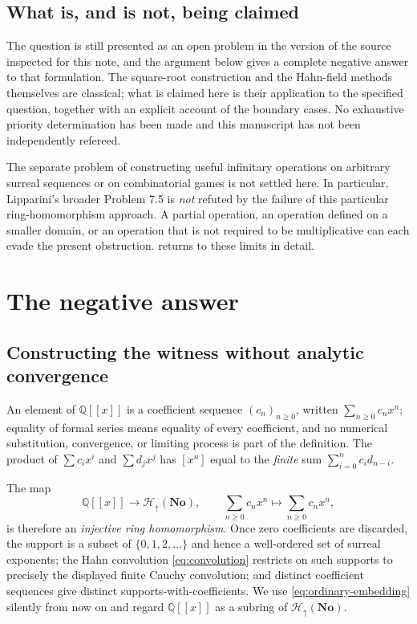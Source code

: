 \documentclass[11pt,letterpaper]{article}
\theoremstyle{definition}
\theoremstyle{remark}
\newcommand{\No}{\mathbf{No}}
\newcommand{\Q}{\mathbb Q}
\newcommand{\Hfull}{\mathcal H_{\uparrow}(\No)}
\newcommand{\coeff}[2]{[#1^{#2}]}
\begin{document}
\subsection{What is, and is not, being claimed}\label{sec:claims}
The question is still presented as an open problem in the version of the
source inspected for this note, and the argument below gives a complete
negative answer to that formulation. The square-root construction and the
Hahn-field methods themselves are classical; what is claimed here is their
application to the specified question, together with an explicit account of
the boundary cases. No exhaustive priority determination has been made and
this manuscript has not been independently refereed.

The separate problem of constructing useful infinitary operations on
arbitrary surreal sequences or on combinatorial games is not settled here.
In particular, Lipparini's broader Problem 7.5 is \emph{not} refuted by the
failure of this particular ring-homomorphism approach. A partial operation,
an operation defined on a smaller domain, or an operation that is not
required to be multiplicative can each evade the present obstruction.
 returns to these limits in detail.

\section{The negative answer}\label{sec:main}

\subsection{Constructing the witness without analytic convergence}
An element of $\Q[[x]]$ is a coefficient sequence $(c_n)_{n\ge0}$, written
$\sum_{n\ge0}c_nx^n$; equality of formal series means equality of every
coefficient, and no numerical substitution, convergence, or limiting process
is part of the definition. The product of $\sum c_ix^i$ and $\sum d_jx^j$ has
$\coeff{x}{n}$ equal to the \emph{finite} sum $\sum_{i=0}^{n}c_id_{n-i}$.

The map
\begin{equation}\label{eq:ordinary-embedding}
 \Q[[x]]\longrightarrow\Hfull,
 \qquad \sum_{n\ge0}c_nx^n\longmapsto\sum_{n\ge0}c_nx^n,
\end{equation}
is therefore an \emph{injective ring homomorphism}. Once zero coefficients are
discarded, the support is a subset of $\{0,1,2,\ldots\}$ and hence a
well-ordered set of surreal exponents; the Hahn convolution
\eqref{eq:convolution} restricts on such supports to precisely the displayed
finite Cauchy convolution; and distinct coefficient sequences give distinct
supports-with-coefficients. We use \eqref{eq:ordinary-embedding} silently from
now on and regard $\Q[[x]]$ as a subring of $\Hfull$.
\end{document}

